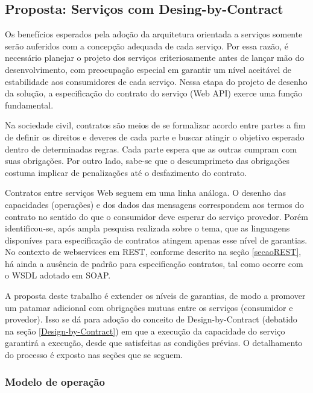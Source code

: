  
 
\subsection{Proposta: Serviços com Desing-by-Contract}
\vspace{-6mm}

Os benefícios esperados pela adoção da arquitetura orientada a serviços
somente serão auferidos com a concepção adequada de cada serviço. 
Por essa razão, é necessário planejar o projeto dos serviços criteriosamente
antes de lançar mão do desenvolvimento, com preocupação especial em garantir
um nível aceitável de estabilidade aos consumidores de cada serviço.
Nessa etapa do projeto de desenho da solução, a especificação do contrato do
serviço (Web API) exerce uma função fundamental. 

Na sociedade civil, contratos são meios de se formalizar acordo entre partes a
fim de definir os direitos e deveres de cada parte e buscar atingir o
objetivo esperado dentro de determinadas regras. Cada parte espera que as outras
cumpram com suas obrigações.
Por outro lado, sabe-se que o descumprimeto das obrigações costuma implicar de
penalizações até o desfazimento do contrato. 

Contratos entre serviços Web seguem em uma linha análoga. O desenho das
capacidades (operações) e dos dados das mensagens correspondem aos
termos do contrato no sentido do que o consumidor deve esperar do serviço
provedor. Porém identificou-se, após ampla pesquisa realizada sobre o tema, que
as linguagens disponíves para especificação de contratos atingem apenas esse
nível de garantias. No contexto de webservices em REST, conforme descrito na
seção \ref{secaoREST}, há ainda a ausência de padrão para especificação
contratos, tal como ocorre com o WSDL adotado em SOAP.

A proposta deste trabalho é extender os níveis de garantias, de modo a promover
um patamar adicional com obrigações mutuas entre os serviços (consumidor e
provedor). Isso se dá para adoção do conceito de Design-by-Contract (debatido
na seção \ref{Design-by-Contract}) em que a execução da
capacidade do serviço garantirá a execução, desde que satisfeitas as condições
prévias. O detalhamento do processo é exposto nas seções que se seguem.

\vspace{-6mm}

\subsubsection{Modelo de operação}
\vspace{-6mm}

